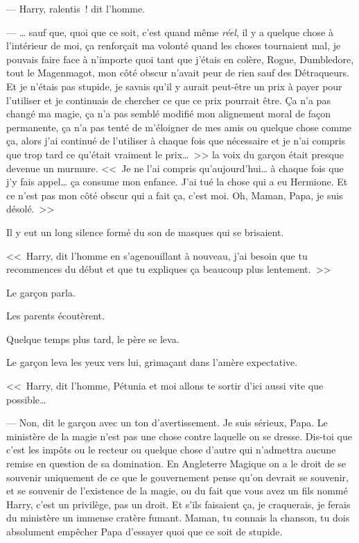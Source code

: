 --- Harry, ralentis~! dit l'homme.

--- … sauf que, quoi que ce soit, c'est quand même \emph{réel}, il y a quelque chose à l'intérieur de moi, ça renforçait ma volonté quand les choses tournaient mal, je pouvais faire face à n'importe quoi tant que j'étais en colère, Rogue, Dumbledore, tout le Magenmagot, mon côté obscur n'avait peur de rien sauf des Détraqueurs. Et je n'étais pas stupide, je savais qu'il y aurait peut-être un prix à payer pour l'utiliser et je continuais de chercher ce que ce prix pourrait être. Ça n'a pas changé ma magie, ça n'a pas semblé modifié mon alignement moral de façon permanente, ça n'a pas tenté de m'éloigner de mes amis ou quelque chose comme ça, alors j'ai continué de l'utiliser à chaque fois que nécessaire et je n'ai compris que trop tard ce qu'était vraiment le prix…~>> la voix du garçon était presque devenue un murmure. <<~Je ne l'ai compris qu'aujourd'hui… à chaque fois que j'y fais appel… ça consume mon enfance. J'ai tué la chose qui a eu Hermione. Et ce n'est pas mon côté obscur qui a fait ça, c'est moi. Oh, Maman, Papa, je suis désolé.~>>

Il y eut un long silence formé du son de masques qui se brisaient.

<<~Harry, dit l'homme en s'agenouillant à nouveau, j'ai besoin que tu recommences du début et que tu expliques ça beaucoup plus lentement.~>>

Le garçon parla.

Les parents écoutèrent.

Quelque temps plus tard, le père se leva.

Le garçon leva les yeux vers lui, grimaçant dans l'amère expectative.

<<~Harry, dit l'homme, Pétunia et moi allons te sortir d'ici aussi vite que possible…

--- Non, dit le garçon avec un ton d'avertissement. Je suis sérieux, Papa. Le ministère de la magie n'est pas une chose contre laquelle on se dresse. Dis-toi que c'est les impôts ou le recteur ou quelque chose d'autre qui n'admettra aucune remise en question de sa domination. En Angleterre Magique on a le droit de se souvenir uniquement de ce que le gouvernement pense qu'on devrait se souvenir, et se souvenir de l'existence de la magie, ou du fait que vous avez un fils nommé Harry, c'est un privilège, pas un droit. Et s'ils faisaient ça, je craquerais, je ferais du ministère un immense cratère fumant. Maman, tu connais la chanson, tu dois absolument empêcher Papa d'essayer quoi que ce soit de stupide.

